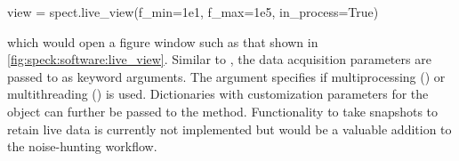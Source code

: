 \begin{pycode}
    view = spect.live_view(f_min=1e1, f_max=1e5, in_process=True)
\end{pycode}

which would open a figure window such as that shown in \cref{fig:speck:software:live_view}.
Similar to , the data acquisition parameters are passed to  as keyword arguments.
The  argument specifies if multiprocessing () or multithreading () is used.
Dictionaries with customization parameters for the  object can further be passed to the method.
Functionality to take snapshots to retain live data is currently not implemented but would be a valuable addition to the noise-hunting workflow.

